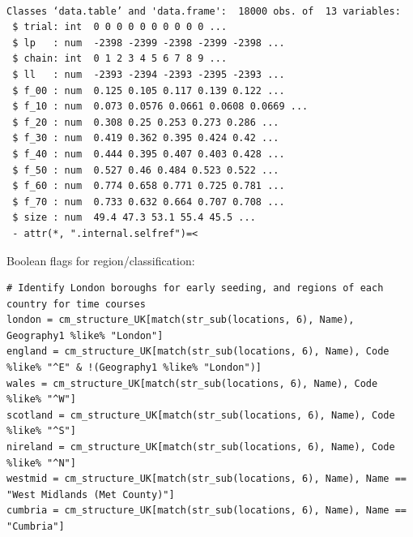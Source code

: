 \documentclass[11pt]{article}
\begin{document}
\begin{verbatim}

Classes ‘data.table’ and 'data.frame':	18000 obs. of  13 variables:
 $ trial: int  0 0 0 0 0 0 0 0 0 0 ...
 $ lp   : num  -2398 -2399 -2398 -2399 -2398 ...
 $ chain: int  0 1 2 3 4 5 6 7 8 9 ...
 $ ll   : num  -2393 -2394 -2393 -2395 -2393 ...
 $ f_00 : num  0.125 0.105 0.117 0.139 0.122 ...
 $ f_10 : num  0.073 0.0576 0.0661 0.0608 0.0669 ...
 $ f_20 : num  0.308 0.25 0.253 0.273 0.286 ...
 $ f_30 : num  0.419 0.362 0.395 0.424 0.42 ...
 $ f_40 : num  0.444 0.395 0.407 0.403 0.428 ...
 $ f_50 : num  0.527 0.46 0.484 0.523 0.522 ...
 $ f_60 : num  0.774 0.658 0.771 0.725 0.781 ...
 $ f_70 : num  0.733 0.632 0.664 0.707 0.708 ...
 $ size : num  49.4 47.3 53.1 55.4 45.5 ...
 - attr(*, ".internal.selfref")=<
\end{verbatim}


Boolean flags for region/classification:
\begin{verbatim}
# Identify London boroughs for early seeding, and regions of each country for time courses
london = cm_structure_UK[match(str_sub(locations, 6), Name), Geography1 %like% "London"]
england = cm_structure_UK[match(str_sub(locations, 6), Name), Code %like% "^E" & !(Geography1 %like% "London")]
wales = cm_structure_UK[match(str_sub(locations, 6), Name), Code %like% "^W"]
scotland = cm_structure_UK[match(str_sub(locations, 6), Name), Code %like% "^S"]
nireland = cm_structure_UK[match(str_sub(locations, 6), Name), Code %like% "^N"]
westmid = cm_structure_UK[match(str_sub(locations, 6), Name), Name == "West Midlands (Met County)"]
cumbria = cm_structure_UK[match(str_sub(locations, 6), Name), Name == "Cumbria"]
\end{verbatim}
\end{document}
